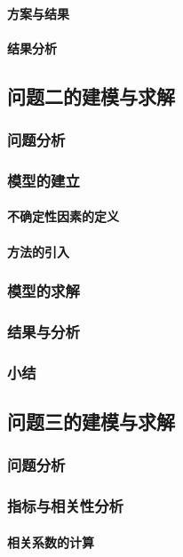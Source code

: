 \documentclass[withoutpreface]{cumcmthesis}
\begin{document}
\paragraph{方案与结果}
\paragraph{结果分析}

\subsection{问题二的建模与求解}
\subsubsection{问题分析}
\subsubsection{模型的建立}
\paragraph{不确定性因素的定义}
\paragraph{方法的引入}
\subsubsection{模型的求解}
\subsubsection{结果与分析}
\subsubsection{小结}

\subsection{问题三的建模与求解}
\subsubsection{问题分析}
\subsubsection{指标与相关性分析}
\paragraph{相关系数的计算}
\end{document}
